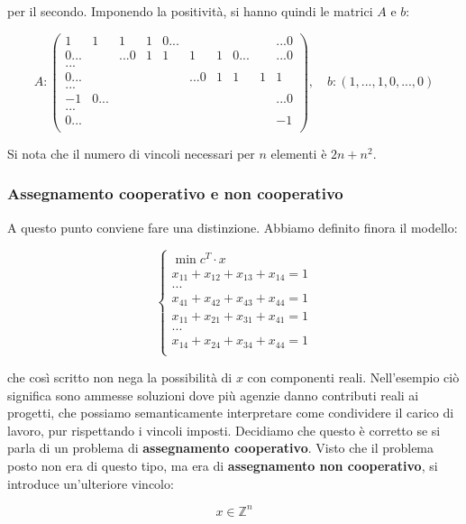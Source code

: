 \documentclass[a4paper,11pt]{article}
\begin{document}
per il secondo.
Imponendo la positività, si hanno quindi le matrici $A$ e $b$:

$$
A: 
\begin{pmatrix}
	1 & 1 & 1 & 1 & 0... & &  & & & ...0 \\
	0... & & ...0 & 1 & 1 & 1 & 1 & 0... & & ...0 \\
	... \\
	0... & &  & & & ...0 & 1 & 1 & 1 & 1 \\
	...\\
	-1 & 0... & & & & & & & & ...0 \\
	...\\
	0... & & & & & & & & & -1 \\
\end{pmatrix}, \quad 
b: ( 1, ..., 1, 0, ..., 0)
$$

Si nota che il numero di vincoli necessari per $n$ elementi è $2n + n^2$.

\subsubsection{Assegnamento cooperativo e non cooperativo}
A questo punto conviene fare una distinzione.
Abbiamo definito finora il modello:

\[
	\begin{cases}
		\min{c^T \cdot x} \\
		x_{11} + x_{12} + x_{13} + x_{14} = 1	\\
		...\\
		x_{41} + x_{42} + x_{43} + x_{44} = 1 \\
		x_{11} + x_{21} + x_{31} + x_{41} = 1	\\
		...\\
		x_{14} + x_{24} + x_{34} + x_{44} = 1 \\ 
 
	\end{cases}
\]

che così scritto non nega la possibilità di $x$ con componenti reali.
Nell'esempio ciò significa sono ammesse soluzioni dove più agenzie danno contributi reali ai progetti, che possiamo semanticamente interpretare come condividere il carico di lavoro, pur rispettando i vincoli imposti.
Decidiamo che questo è corretto se si parla di un problema di \textbf{assegnamento cooperativo}.
Visto che il problema posto non era di questo tipo, ma era di \textbf{assegnamento non cooperativo}, si introduce un'ulteriore vincolo:

$$
	x \in \mathbb{Z}^n
$$
\end{document}
